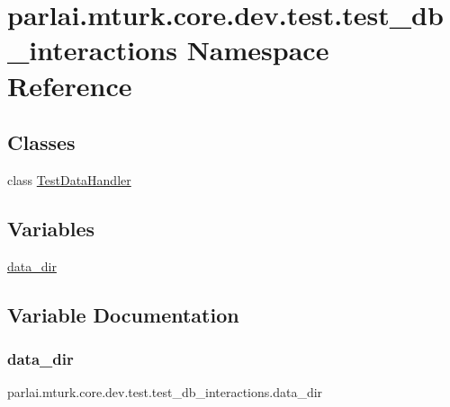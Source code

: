 \hypertarget{namespaceparlai_1_1mturk_1_1core_1_1dev_1_1test_1_1test__db__interactions}{}\section{parlai.\+mturk.\+core.\+dev.\+test.\+test\+\_\+db\+\_\+interactions Namespace Reference}
\label{namespaceparlai_1_1mturk_1_1core_1_1dev_1_1test_1_1test__db__interactions}
\subsection*{Classes}
\begin{DoxyCompactItemize}
\item 
class \hyperlink{classparlai_1_1mturk_1_1core_1_1dev_1_1test_1_1test__db__interactions_1_1TestDataHandler}{Test\+Data\+Handler}
\end{DoxyCompactItemize}
\subsection*{Variables}
\begin{DoxyCompactItemize}
\item 
\hyperlink{namespaceparlai_1_1mturk_1_1core_1_1dev_1_1test_1_1test__db__interactions_a1f7ad55ce9f58b4a346558e02060ce66}{data\+\_\+dir}
\end{DoxyCompactItemize}


\subsection{Variable Documentation}
\mbox{\label{namespaceparlai_1_1mturk_1_1core_1_1dev_1_1test_1_1test__db__interactions_a1f7ad55ce9f58b4a346558e02060ce66}} 
\subsubsection{\texorpdfstring{data\+\_\+dir}{data\_dir}}
{\footnotesize\ttfamily parlai.\+mturk.\+core.\+dev.\+test.\+test\+\_\+db\+\_\+interactions.\+data\+\_\+dir}

